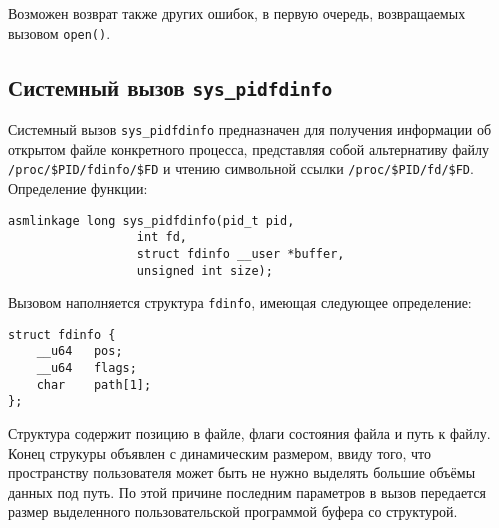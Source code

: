 Возможен возврат также других ошибок, в первую очередь, возвращаемых вызовом
\texttt{open()}.

\subsection{Системный вызов \texttt{sys\_pidfdinfo}}

Системный вызов \texttt{sys\_pidfdinfo} предназначен для получения информации об
открытом файле конкретного процесса, представляя собой
альтернативу файлу \texttt{/proc/\$PID/fdinfo/\$FD} и чтению символьной ссылки 
\texttt{/proc/\$PID/fd/\$FD}. Определение функции:

\medskip
\begin{lstlisting}[style=cstyle]
asmlinkage long sys_pidfdinfo(pid_t pid,
			      int fd,
			      struct fdinfo __user *buffer,
			      unsigned int size);
\end{lstlisting}
\medskip

Вызовом наполняется структура \texttt{fdinfo}, имеющая следующее определение:

\medskip
\begin{lstlisting}[style=cstyle]
struct fdinfo {
	__u64	pos;
	__u64	flags;
	char	path[1];
};
\end{lstlisting}
\medskip

Структура содержит позицию в файле, флаги состояния файла и путь к файлу. Конец
струкуры объявлен с динамическим размером, ввиду того, что пространству
пользователя может быть не нужно выделять большие объёмы данных под путь. По
этой причине последним параметров в вызов передается размер выделенного
пользовательской программой буфера со структурой.

